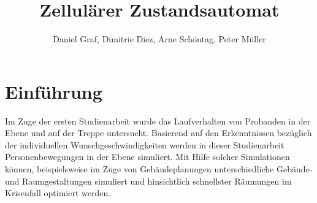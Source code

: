 

\title{Zellulärer Zustandsautomat}
\providecommand{\subtitle}[1]{}
\subtitle{3. Projekt zu Modellierung und Simulation}
\author{Daniel Graf, Dimitrie Diez, Arne Schöntag, Peter Müller}
\date{}



\maketitle

\tableofcontents
\section{Einführung}
Im Zuge der ersten Studienarbeit wurde das Laufverhalten von Probanden in der Ebene und auf der Treppe untersucht. Basierend auf den Erkenntnissen bezüglich der individuellen Wunschgeschwindigkeiten werden in dieser Studienarbeit Personenbewegungen in der Ebene simuliert. Mit Hilfe solcher Simulationen können, beispielsweise im Zuge von Gebäudeplanungen unterschiedliche Gebäude- und Raumgestaltungen simuliert und hinsichtlich schnellster Räumungen im Krisenfall optimiert werden. 
\newpage

